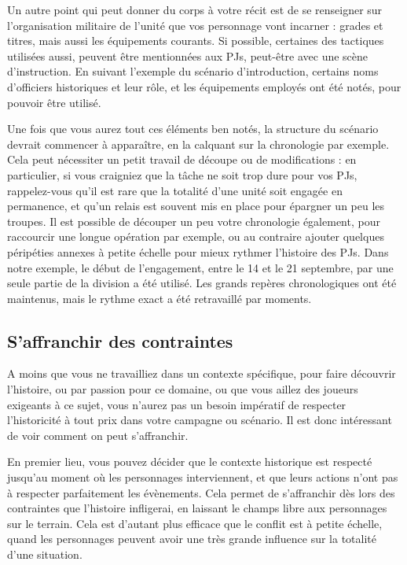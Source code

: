 \documentclass{report}
\begin{document}
\begin{multicols}{2}
Un autre point qui peut donner du corps à votre récit est de se renseigner sur l'organisation militaire de l'unité que vos personnage vont incarner : grades et titres, mais aussi les équipements courants. Si possible, certaines des tactiques utilisées aussi, peuvent être mentionnées aux PJs, peut-être avec une scène d'instruction. En suivant l'exemple du scénario d'introduction, certains noms d'officiers historiques et leur rôle, et les équipements employés ont été notés, pour pouvoir être utilisé.

Une fois que vous aurez tout ces éléments ben notés, la structure du scénario devrait commencer à apparaître, en la calquant sur la chronologie par exemple. Cela peut nécessiter un petit travail de découpe ou de modifications : en particulier, si vous craigniez que la tâche ne soit trop dure pour vos PJs, rappelez-vous qu'il est rare que la totalité d'une unité soit engagée en permanence, et qu'un relais est souvent mis en place pour épargner un peu les troupes. Il est possible de découper un peu votre chronologie également, pour raccourcir une longue opération par exemple, ou au contraire ajouter quelques péripéties annexes à petite échelle pour mieux rythmer l'histoire des PJs. Dans notre exemple, le début de l'engagement, entre le 14 et le 21 septembre, par une seule partie de la division a été utilisé. Les grands repères chronologiques ont été maintenus, mais le rythme exact a été retravaillé par moments.

\subsection{S'affranchir des contraintes}
A moins que vous ne travailliez dans un contexte spécifique, pour faire découvrir l'histoire, ou par passion pour ce domaine, ou que vous aillez des joueurs exigeants à ce sujet, vous n'aurez pas un besoin impératif de respecter l'historicité à tout prix dans votre campagne ou scénario. Il est donc intéressant de voir comment on peut s'affranchir.

En premier lieu, vous pouvez décider que le contexte historique est respecté jusqu'au moment où les personnages interviennent, et que leurs actions n'ont pas à respecter parfaitement les évènements. Cela permet de s'affranchir dès lors des contraintes que l'histoire infligerai, en laissant le champs libre aux personnages sur le terrain. Cela est d'autant plus efficace que le conflit est à petite échelle, quand les personnages peuvent avoir une très grande influence sur la totalité d'une situation.


\end{multicols}
\end{document}
